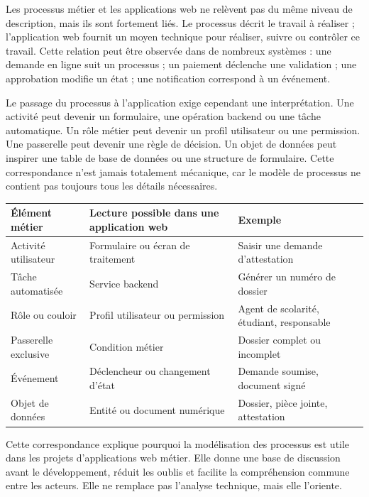 
Les processus métier et les applications web ne relèvent pas du même niveau de description, mais ils sont fortement liés. Le processus décrit le travail à réaliser ; l'application web fournit un moyen technique pour réaliser, suivre ou contrôler ce travail. Cette relation peut être observée dans de nombreux systèmes : une demande en ligne suit un processus ; un paiement déclenche une validation ; une approbation modifie un état ; une notification correspond à un événement.

Le passage du processus à l'application exige cependant une interprétation. Une activité peut devenir un formulaire, une opération backend ou une tâche automatique. Un rôle métier peut devenir un profil utilisateur ou une permission. Une passerelle peut devenir une règle de décision. Un objet de données peut inspirer une table de base de données ou une structure de formulaire. Cette correspondance n'est jamais totalement mécanique, car le modèle de processus ne contient pas toujours tous les détails nécessaires.

\begin{center}
\begin{tabular}{|p{4cm}|p{5cm}|p{5.2cm}|}
\hline
\textbf{Élément métier} & \textbf{Lecture possible dans une application web} & \textbf{Exemple} \\
\hline
Activité utilisateur & Formulaire ou écran de traitement & Saisir une demande d'attestation \\
\hline
Tâche automatisée & Service backend & Générer un numéro de dossier \\
\hline
Rôle ou couloir & Profil utilisateur ou permission & Agent de scolarité, étudiant, responsable \\
\hline
Passerelle exclusive & Condition métier & Dossier complet ou incomplet \\
\hline
Événement & Déclencheur ou changement d'état & Demande soumise, document signé \\
\hline
Objet de données & Entité ou document numérique & Dossier, pièce jointe, attestation \\
\hline
\end{tabular}
\end{center}

Cette correspondance explique pourquoi la modélisation des processus est utile dans les projets d'applications web métier. Elle donne une base de discussion avant le développement, réduit les oublis et facilite la compréhension commune entre les acteurs. Elle ne remplace pas l'analyse technique, mais elle l'oriente.

